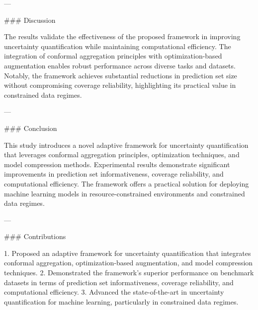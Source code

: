 ---

### Discussion

The results validate the effectiveness of the proposed framework in improving uncertainty quantification while maintaining computational efficiency. The integration of conformal aggregation principles with optimization-based augmentation enables robust performance across diverse tasks and datasets. Notably, the framework achieves substantial reductions in prediction set size without compromising coverage reliability, highlighting its practical value in constrained data regimes.

---

### Conclusion

This study introduces a novel adaptive framework for uncertainty quantification that leverages conformal aggregation principles, optimization techniques, and model compression methods. Experimental results demonstrate significant improvements in prediction set informativeness, coverage reliability, and computational efficiency. The framework offers a practical solution for deploying machine learning models in resource-constrained environments and constrained data regimes.

---

### Contributions

1. Proposed an adaptive framework for uncertainty quantification that integrates conformal aggregation, optimization-based augmentation, and model compression techniques.
2. Demonstrated the framework's superior performance on benchmark datasets in terms of prediction set informativeness, coverage reliability, and computational efficiency.
3. Advanced the state-of-the-art in uncertainty quantification for machine learning, particularly in constrained data regimes.

